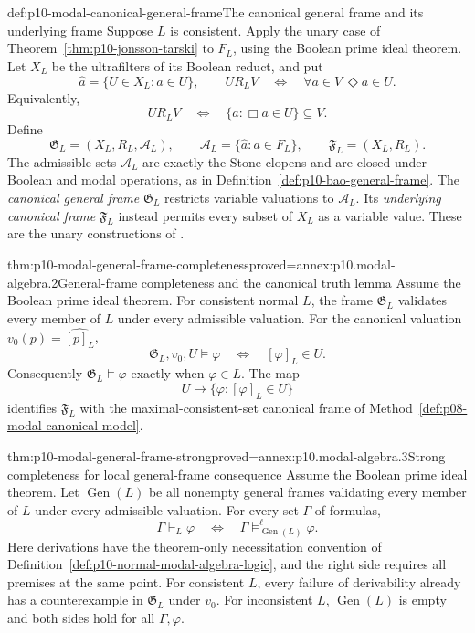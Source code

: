 \begin{hbdefinition}{def:p10-modal-canonical-general-frame}{The canonical general frame and its underlying frame}
Suppose \(L\) is consistent.
Apply the unary case of Theorem~\ref{thm:p10-jonsson-tarski} to
\(F_L\), using the Boolean prime ideal theorem.
Let \(X_L\) be the ultrafilters of its Boolean reduct, and put
\[
 \widehat a=\{U\in X_L:a\in U\},\qquad
 U R_L V
   \quad\Longleftrightarrow\quad
       \forall a\in V\ \Diamond a\in U.
\]
Equivalently,
\[
 U R_L V
   \quad\Longleftrightarrow\quad
       \{a:\Box a\in U\}\subseteq V.
\]
Define
\[
 \mathfrak G_L=(X_L,R_L,\mathcal A_L),\qquad
 \mathcal A_L=\{\widehat a:a\in F_L\},\qquad
 \mathfrak F_L=(X_L,R_L).
\]
The admissible sets \(\mathcal A_L\) are exactly the Stone clopens
and are closed under Boolean and modal operations, as in
Definition~\ref{def:p10-bao-general-frame}.
The \emph{canonical general frame} \(\mathfrak G_L\) restricts
variable valuations to \(\mathcal A_L\).
Its \emph{underlying canonical frame} \(\mathfrak F_L\) instead
permits every subset of \(X_L\) as a variable value.
These are the unary constructions of
\cite[Example~5.13 and Definition~5.24, pp.~20, 22]{Venema2005Preprint}.
\end{hbdefinition}

\begin{hbtheorem}{thm:p10-modal-general-frame-completeness}{proved=annex:p10.modal-algebra.2}{General-frame completeness and the canonical truth lemma}
Assume the Boolean prime ideal theorem.
For consistent normal \(L\), the frame \(\mathfrak G_L\) validates
every member of \(L\) under every admissible valuation.
For the canonical valuation \(v_0(p)=\widehat{[p]_L}\),
\[
 \mathfrak G_L,v_0,U\models\varphi
           \quad\Longleftrightarrow\quad[\varphi]_L\in U.
\]
Consequently \(\mathfrak G_L\models\varphi\) exactly when
\(\varphi\in L\).
The map
\[
 U\longmapsto\{\varphi:[\varphi]_L\in U\}
\]
identifies \(\mathfrak F_L\) with the maximal-consistent-set
canonical frame of Method~\ref{def:p08-modal-canonical-model}.
\end{hbtheorem}

\begin{hbtheorem}{thm:p10-modal-general-frame-strong}{proved=annex:p10.modal-algebra.3}{Strong completeness for local general-frame consequence}
Assume the Boolean prime ideal theorem.
Let \(\operatorname{Gen}(L)\) be all nonempty general frames
validating every member of \(L\) under every admissible valuation.
For every set \(\Gamma\) of formulas,
\[
 \Gamma\vdash_L\varphi
       \quad\Longleftrightarrow\quad
 \Gamma\models^\ell_{\operatorname{Gen}(L)}\varphi.
\]
Here derivations have the theorem-only necessitation convention of
Definition~\ref{def:p10-normal-modal-algebra-logic}, and the right side
requires all premises at the same point.
For consistent \(L\), every failure of derivability already has
a counterexample in \(\mathfrak G_L\) under \(v_0\).
For inconsistent \(L\), \(\operatorname{Gen}(L)\) is empty and
both sides hold for all \(\Gamma,\varphi\).
\end{hbtheorem}


